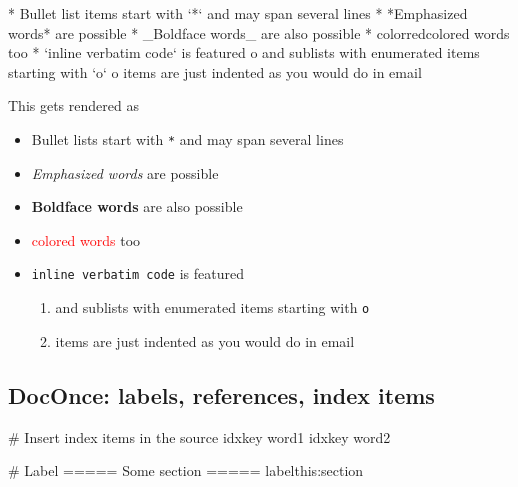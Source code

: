 \documentclass[%
oneside,                 %
final,                   %
10pt]{article}
\begin{document}
\bdat
 * Bullet list items start with `*`
   and may span several lines
 * *Emphasized words* are possible
 * _Boldface words_ are also possible
 * color{red}{colored words} too
 * `inline verbatim code` is featured
   o and sublists with enumerated items starting with `o`
   o items are just indented as you would do in email

\edat


This gets rendered as

\begin{itemize}
 \item Bullet lists start with \texttt{*} and may span several lines

 \item \emph{Emphasized words} are possible

 \item \textbf{Boldface words} are also possible

 \item \textcolor{red}{colored words} too

 \item \texttt{inline verbatim code} is featured
\begin{enumerate}

  \item and sublists with enumerated items starting with \texttt{o}

  \item items are just indented as you would do in email
\end{enumerate}

\noindent
\end{itemize}

\noindent
\subsection{DocOnce: labels, references, index items}






















\bdo
# Insert index items in the source
idx{key word1} idx{key word2}

# Label
===== Some section =====
label{this:section}
\end{document}
